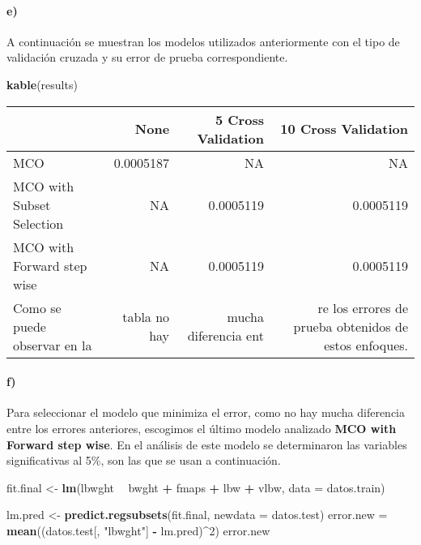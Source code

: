 \documentclass[]{article}
\newenvironment{Shaded}{\begin{snugshade}}{\end{snugshade}}
\newcommand{\KeywordTok}[1]{\textcolor[rgb]{0.13,0.29,0.53}{\textbf{#1}}}
\newcommand{\DataTypeTok}[1]{\textcolor[rgb]{0.13,0.29,0.53}{#1}}
\newcommand{\DecValTok}[1]{\textcolor[rgb]{0.00,0.00,0.81}{#1}}
\newcommand{\StringTok}[1]{\textcolor[rgb]{0.31,0.60,0.02}{#1}}
\newcommand{\OperatorTok}[1]{\textcolor[rgb]{0.81,0.36,0.00}{\textbf{#1}}}
\newcommand{\NormalTok}[1]{#1}
\let\oldparagraph\paragraph
\renewcommand{\paragraph}[1]{\oldparagraph{#1}\mbox{}}
\begin{document}
\paragraph{e)}\label{e}

A continuación se muestran los modelos utilizados anteriormente con el
tipo de validación cruzada y su error de prueba correspondiente.

\begin{Shaded}
\begin{Highlighting}[]
\KeywordTok{kable}\NormalTok{(results)}
\end{Highlighting}
\end{Shaded}

\begin{longtable}[]{@{}lrrr@{}}
\toprule
& None & 5 Cross Validation & 10 Cross Validation\tabularnewline
\midrule
\endhead
MCO & 0.0005187 & NA & NA\tabularnewline
MCO with Subset Selection & NA & 0.0005119 & 0.0005119\tabularnewline
MCO with Forward step wise & NA & 0.0005119 & 0.0005119\tabularnewline
Como se puede observar en la & tabla no hay & mucha diferencia ent & re
los errores de prueba obtenidos de estos enfoques.\tabularnewline
\bottomrule
\end{longtable}

\paragraph{f)}\label{f}

Para seleccionar el modelo que minimiza el error, como no hay mucha
diferencia entre los errores anteriores, escogimos el último modelo
analizado \textbf{MCO with Forward step wise}. En el análisis de este
modelo se determinaron las variables significativas al 5\%, son las que
se usan a continuación.

\begin{Shaded}
\begin{Highlighting}[]
\NormalTok{fit.final <-}\StringTok{ }\KeywordTok{lm}\NormalTok{(lbwght }\OperatorTok{~}\StringTok{ }\NormalTok{bwght }\OperatorTok{+}\StringTok{ }\NormalTok{fmaps }\OperatorTok{+}\StringTok{ }\NormalTok{lbw }\OperatorTok{+}\StringTok{ }\NormalTok{vlbw, }\DataTypeTok{data =}\NormalTok{ datos.train)}

\NormalTok{lm.pred <-}\StringTok{ }\KeywordTok{predict.regsubsets}\NormalTok{(fit.final, }\DataTypeTok{newdata =}\NormalTok{ datos.test)}
\NormalTok{error.new =}\StringTok{  }\KeywordTok{mean}\NormalTok{((datos.test[, }\StringTok{"lbwght"}\NormalTok{] }\OperatorTok{-}\StringTok{ }\NormalTok{lm.pred)}\OperatorTok{^}\DecValTok{2}\NormalTok{)}
\NormalTok{error.new}
\end{Highlighting}
\end{Shaded}
\end{document}
